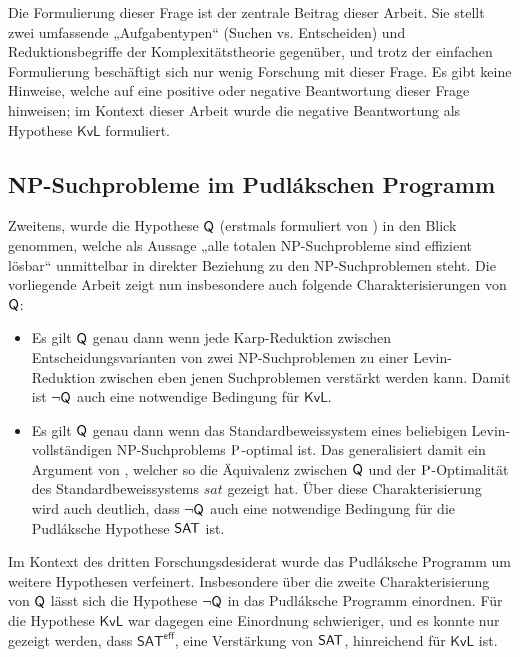 Die Formulierung dieser Frage ist der zentrale Beitrag dieser Arbeit.
Sie stellt zwei umfassende „Aufgabentypen“ (Suchen vs. Entscheiden) und Reduktionsbegriffe der Komplexitätstheorie gegenüber, und trotz der einfachen Formulierung beschäftigt sich nur wenig Forschung mit dieser Frage.
Es gibt keine Hinweise, welche auf eine positive oder negative Beantwortung dieser Frage hinweisen; im Kontext dieser Arbeit wurde die negative Beantwortung als Hypothese $\mathsf{KvL}$ formuliert.



\subsection*{NP-Suchprobleme im Pudlákschen Programm}

Zweitens, wurde die Hypothese $\hQ$ (erstmals formuliert von \cite{fenner_inverting_1996}) in den Blick genommen, welche als Aussage „alle totalen NP-Suchprobleme sind effizient lösbar“ unmittelbar in direkter Beziehung zu den NP-Suchproblemen steht.
Die vorliegende Arbeit zeigt nun insbesondere auch folgende Charakterisierungen von $\hQ$:
\begin{itemize}[midpenalty=0]
    \item Es gilt $\hQ$ genau dann wenn jede Karp-Reduktion zwischen Entscheidungsvarianten von zwei NP-Suchproblemen zu einer Levin-Reduktion zwischen eben jenen Suchproblemen verstärkt werden kann. Damit ist $\neg\hQ$ auch eine notwendige Bedingung für $\mathsf{KvL}$.
    \item Es gilt $\hQ$ genau dann wenn das Standardbeweissystem eines beliebigen Levin-vollständigen NP-Suchproblems $\P$-optimal ist. Das generalisiert damit ein Argument von \textcite{messner_simulation_2001}, welcher so die Äquivalenz zwischen $\hQ$ und der $\P$-Optimalität des Standardbeweissystems $\mathit{sat}$ gezeigt hat. Über diese Charakterisierung wird auch deutlich, dass $\neg\hQ$ auch eine notwendige Bedingung für die Pudláksche Hypothese $\hSAT$ ist.
\end{itemize}
Im Kontext des dritten Forschungsdesiderat wurde das Pudláksche Programm um weitere Hypothesen verfeinert. Insbesondere über die zweite Charakterisierung von $\hQ$ lässt sich die Hypothese $\neg\hQ$ in das Pudláksche Programm einordnen. Für die Hypothese $\mathsf{KvL}$ war dagegen eine Einordnung schwieriger, und es konnte nur gezeigt werden, dass $\mathsf{SAT^{eff}}$, eine Verstärkung von $\hSAT$, hinreichend für $\mathsf{KvL}$ ist.

